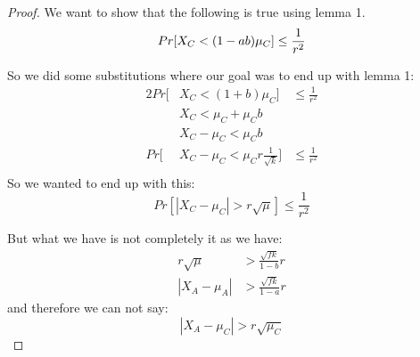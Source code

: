 \begin{proof}
    We want to show that the following is true using lemma 1.
    \begin{equation*}
        Pr[X_C < (1-ab)\mu_C] \le \frac{1}{r^2}\\
    \end{equation*}

    So we did some substitutions where our goal was to end up with lemma 1:
    \begin{alignat*}{2}
        Pr[&X_C < (1+b)\mu_C]& \le \frac{1}{r^2}\\
        &X_C < \mu_C + \mu_C b&\\
        &X_C - \mu_C < \mu_C b&\\
        Pr[&X_C - \mu_C < \mu_C r \frac{1}{\sqrt{k}}]& \le \frac{1}{r^2}\\ 
    \end{alignat*}
    So we wanted to end up with this:
    \begin{equation*}
        Pr[|X_C - \mu_C| > r \sqrt{\mu}] \le \frac{1}{r^2}
    \end{equation*}

    But what we have is not completely it as we have:
    \begin{align*}
        r \sqrt{\mu} &> \frac{\sqrt{fk}}{1-b} r\\
        |X_A - \mu_A| &> \frac{\sqrt{fk}}{1-a} r
    \end{align*}
    and therefore we can not say:
    \begin{equation*}
        |X_A - \mu_C| > r \sqrt{\mu_C}
    \end{equation*}


\end{proof}
